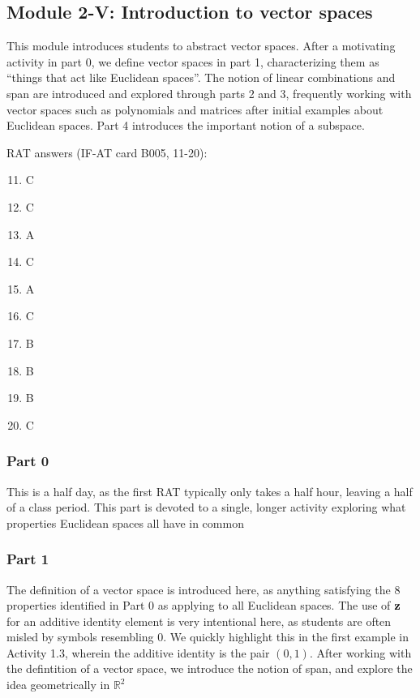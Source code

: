 \documentclass{article}
\begin{document}
\subsection*{Module 2-V: Introduction to vector spaces}
This module introduces students to abstract vector spaces.  After a motivating activity in part 0, we define vector spaces in part 1, characterizing them as ``things that act like Euclidean spaces''.  The notion of linear combinations and span are introduced and explored through parts 2 and 3, frequently working with vector spaces such as polynomials and matrices after initial examples about Euclidean spaces.  Part 4 introduces the important notion of a subspace.

RAT answers (IF-AT card B005, 11-20):
\begin{multicols}{10}
\begin{enumerate}[1)]
\setcounter{enumi}{10}
\item C
\item C
\item A
\item C
\item A
\item C
\item B
\item B
\item B
\item C
\end{enumerate}
\end{multicols}

\subsubsection*{Part 0}
This is a half day, as the first RAT typically only takes a half hour, leaving a half of a class period.  This part is devoted to a single, longer activity exploring what properties Euclidean spaces all have in common

\subsubsection*{Part 1}
The definition of a vector space is introduced here, as anything satisfying the 8 properties identified in Part 0 as applying to all Euclidean spaces.  The use of \(\bf{z}\) for an additive identity element is very intentional here, as students are often misled by symbols resembling \(0\).  We quickly highlight this in the first example in Activity 1.3, wherein the additive identity is the pair \((0,1)\).  After working with the defintition of a vector space, we introduce the notion of span, and explore the idea geometrically in \(\mathbb{R}^2\)
\end{document}
